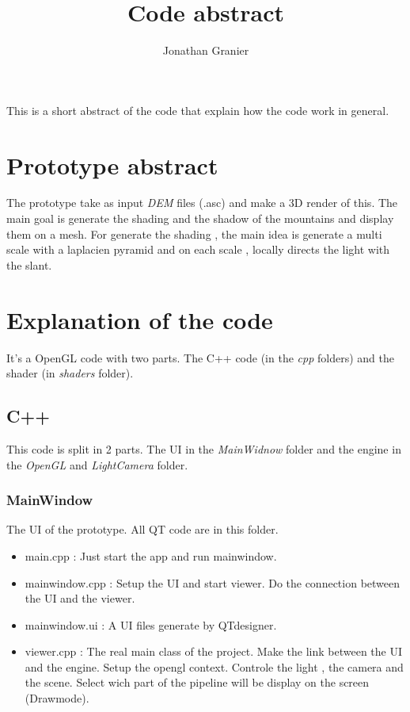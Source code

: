 \documentclass[a4paper]{article}
\title{Code abstract}
\author{Jonathan Granier}
\begin{document}
\maketitle

This is a short abstract of the code that explain how the code work in general.

\section{Prototype abstract}

The prototype take as input \textit{DEM} files (.asc) and make a 3D render of this. The main goal is generate the shading and the shadow of the mountains and display them on a mesh. For generate the shading , the main idea is generate a multi scale with a laplacien pyramid and on each scale , locally directs the light with the slant. 




\section{Explanation of the code}
It's a OpenGL code with two parts. The C++ code (in the \textit{cpp} folders) and the shader (in \textit{shaders} folder).  

\subsection{C++}

This code is split in 2 parts. The UI in the \textit{MainWidnow} folder and the engine in the \textit{OpenGL} and \textit{LightCamera} folder.


\subsubsection{MainWindow}
The UI of the prototype. All QT code are in this folder. 

\begin{itemize}
\item main.cpp : Just start the app and run mainwindow.
\item mainwindow.cpp : Setup the UI and start viewer. Do the connection between the UI and the viewer. 
\item mainwindow.ui : A UI files generate by QTdesigner.
\item viewer.cpp : The real main class of the project. Make the link between the UI and the engine. Setup the opengl context. Controle the light , the camera and the scene. Select wich part of the pipeline will be display on the screen (Drawmode). 
\end{itemize}
\end{document}
